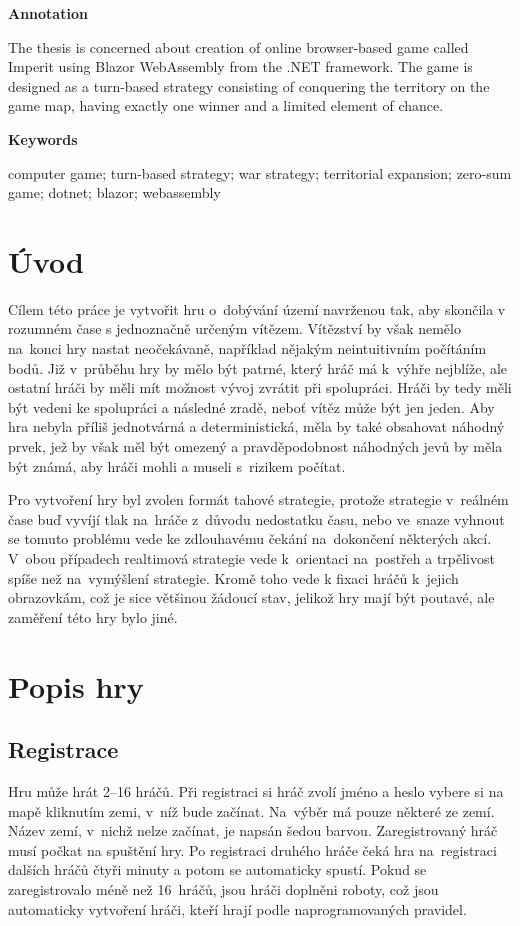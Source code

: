 \documentclass[a4paper,12pt]{article}
\begin{document}
\Large\textbf{Annotation}\normalsize

The thesis is concerned about creation of online browser-based game called Imperit using Blazor WebAssembly from the .NET framework. The game is designed as a turn-based strategy consisting of conquering the territory on the game map, having exactly one winner and a limited element of chance.

\Large\textbf{Keywords}\normalsize

computer game; turn-based strategy; war strategy; territorial expansion; zero-sum game;\- dotnet; blazor; webassembly
\newpage
\thispagestyle{empty}
\tableofcontents
\newpage
\section{Úvod}
Cílem této práce je vytvořit hru o~dobývání území navrženou tak, aby skončila v rozumném čase s jednoznačně určeným vítězem. Vítězství by však nemělo na~konci hry nastat neočekávaně, například nějakým neintuitivním počítáním bodů. Již v~průběhu hry by mělo být patrné, který hráč má k~výhře nejblíže, ale ostatní hráči by měli mít možnost vývoj zvrátit při spolupráci. Hráči by tedy měli být vedeni ke spolupráci a následné zradě, neboť vítěz může být jen jeden. Aby hra nebyla příliš jednotvárná a deterministická, měla by také obsahovat náhodný prvek, jež by však měl být omezený a pravděpodobnost náhodných jevů by měla být známá, aby hráči mohli a museli s~rizikem počítat.

Pro vytvoření hry byl zvolen formát tahové strategie, protože strategie v~reálném čase buď vyvíjí tlak na~hráče z~důvodu nedostatku času, nebo ve~snaze vyhnout se tomuto problému vede ke zdlouhavému čekání na~dokončení některých akcí. \cite{turnreal1} V~obou případech realtimová strategie vede k~orientaci na~postřeh a trpělivost spíše než na~vymýšlení strategie. \cite{turnreal2} Kromě toho vede k fixaci hráčů k~jejich obrazovkám, což je sice většinou žádoucí stav, jelikož hry mají být poutavé, ale zaměření této hry bylo jiné.

\section{Popis hry}
\subsection{Registrace}
Hru může hrát 2--16 hráčů. Při registraci si hráč zvolí jméno a heslo vybere si na mapě kliknutím zemi, v~níž bude začínat. Na~výběr má pouze některé ze zemí. Název zemí, v~nichž nelze začínat, je napsán šedou barvou. Zaregistrovaný hráč musí počkat na spuštění hry. Po registraci druhého hráče čeká hra na~registraci dalších hráčů čtyři minuty a potom se automaticky spustí. Pokud se zaregistrovalo méně než 16~hráčů, jsou hráči doplněni roboty, což jsou automaticky vytvoření hráči, kteří hrají podle naprogramovaných pravidel.
\end{document}
